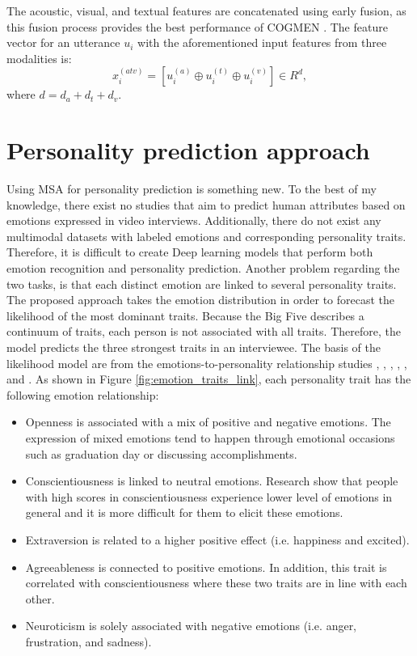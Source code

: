 The acoustic, visual, and textual features are concatenated using early fusion, as this fusion process provides the best performance of COGMEN \cite{COGMEN_joshi-etal-2022-cogmen}. The feature vector for an utterance $u_{i}$ with the aforementioned input features from three modalities is:
%
\begin{equation*}
    x_{i}^{(atv)} = [u_{i}^{(a)} \oplus u_{i}^{(t)} \oplus u_{i}^{(v)}] \in R^{d},
\end{equation*}
%
where $d = d_{a} + d_{t} + d_{v}$. 


\section{Personality prediction approach}
\label{sec:personality_prediction_approach}
Using MSA for personality prediction is something new. To the best of my knowledge, there exist no studies that aim to predict human attributes based on emotions expressed in video interviews. Additionally, there do not exist any multimodal datasets with labeled emotions and corresponding personality traits. Therefore, it is difficult to create Deep learning models that perform both emotion recognition and personality prediction. Another problem regarding the two tasks, is that each distinct emotion are linked to several personality traits. The proposed approach takes the emotion distribution in order to forecast the likelihood of the most dominant traits. Because the Big Five describes a continuum of traits, each person is not associated with all traits. Therefore, the model predicts the three strongest traits in an interviewee. The basis of the likelihood model are from the emotions-to-personality relationship studies \cite{personality1-deyoung2007between}, \cite{personality-and-emotion-revelle2009personality}, \cite{extraversion1-komulainen2014effect}, \cite{personality_emotions_link}, \cite{personality2-9210819}, and \cite{emotion_personalty_correlation_Zhao2018}. As shown in Figure \ref{fig:emotion_traits_link}, each personality trait has the following emotion relationship:
%
\begin{itemize}
    \item Openness is associated with a mix of positive and negative emotions. The expression of mixed emotions tend to happen through emotional occasions such as graduation day or discussing accomplishments. 
    \item Conscientiousness is linked to neutral emotions. Research show that people with high scores in conscientiousness experience lower level of emotions in general and it is more difficult for them to elicit these emotions. 
    \item Extraversion is related to a higher positive effect (i.e. happiness and excited).
    \item Agreeableness is connected to positive emotions. In addition, this trait is correlated with conscientiousness where these two traits are in line with each other. 
    \item Neuroticism is solely associated with negative emotions (i.e. anger, frustration, and sadness).
\end{itemize}
